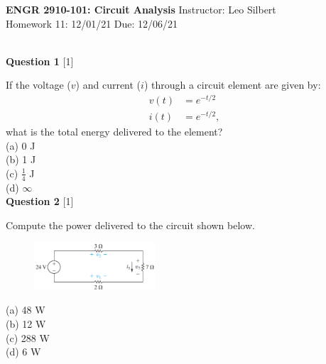 \documentclass[12pt]{article}
\begin{document}

\begin{center}
\hfil
{\large\bf {ENGR 2910-101: Circuit Analysis}}
\hfill Instructor: Leo Silbert \\
Homework 11: 12/01/21 \hfill Due: 12/06/21\\
\hrulefill\\
\end{center}




\noindent
{\bf Question 1} [1]

If the voltage ($v$) and current ($i$) through a circuit element are given by:
\begin{align*}
v(t) &= e^{-t/2}\\
i(t) &= e^{-t/2},
\end{align*}
what is the total energy delivered to the element?\\
 
\noindent
(a) 0 J\\
(b) 1 J \\%
(c) $\tfrac{1}{4}$ J\\
(d) $\infty$\\

\noindent
{\bf Question 2} [1]

Compute the power delivered to the circuit shown below.
\begin{figure}[h!]
     \centering
\vspace{-0.2in}
     \includegraphics[clip,width=0.4\textwidth]{Fig-AP2-5.png}
\vspace{-0.15in}
\end{figure}

\noindent
(a) 48 W \\%
(b) 12 W\\
(c) 288 W\\
(d) 6 W\\
\end{document}
